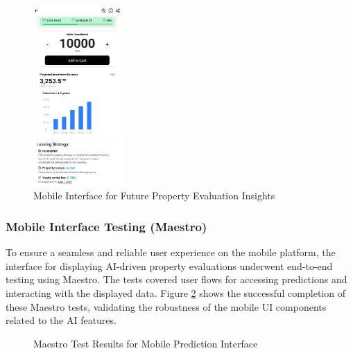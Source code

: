 \begin{figure}[htbp]
    \centering
    \includegraphics[width=0.3\textwidth]{images/mobile_future_evaluation.png} %
    \caption{Mobile Interface for Future Property Evaluation Insights}
    \label{fig:mobile-future-evaluation}
\end{figure}


\subsubsection{Mobile Interface Testing (Maestro)}
To ensure a seamless and reliable user experience on the mobile platform, the interface for displaying AI-driven property evaluations underwent end-to-end testing using Maestro. The tests covered user flows for accessing predictions and interacting with the displayed data. Figure \ref{fig:maestro-tests-mobile} shows the successful completion of these Maestro tests, validating the robustness of the mobile UI components related to the AI features.

\begin{figure}[htbp]
    \centering
    \caption{Maestro Test Results for Mobile Prediction Interface}
    \label{fig:maestro-tests-mobile}
\end{figure}

